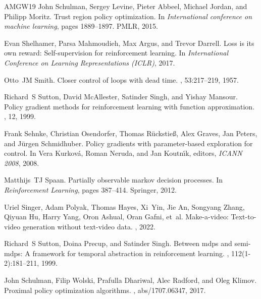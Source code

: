 \begin{thebibliography}{AMGW{\etalchar{+}}19}
John Schulman, Sergey Levine, Pieter Abbeel, Michael Jordan, and Philipp Moritz.
\newblock Trust region policy optimization.
\newblock In {\em International conference on machine learning}, pages 1889--1897. PMLR, 2015.

Evan Shelhamer, Parsa Mahmoudieh, Max Argus, and Trevor Darrell.
\newblock Loss is its own reward: Self-supervision for reinforcement learning.
\newblock In {\em International Conference on Learning Representations (ICLR)}, 2017.

Otto~JM Smith.
\newblock Closer control of loops with dead time.
, 53:217--219, 1957.

Richard~S Sutton, David McAllester, Satinder Singh, and Yishay Mansour.
\newblock Policy gradient methods for reinforcement learning with function approximation.
, 12, 1999.

Frank Sehnke, Christian Osendorfer, Thomas R{\"{u}}ckstie{\ss}, Alex Graves, Jan Peters, and J{\"{u}}rgen Schmidhuber.
\newblock Policy gradients with parameter-based exploration for control.
\newblock In Vera Kurkov{\'{a}}, Roman Neruda, and Jan Koutn{\'{\i}}k, editors, {\em ICANN 2008}, 2008.

Matthijs~TJ Spaan.
\newblock Partially observable markov decision processes.
\newblock In {\em Reinforcement Learning}, pages 387--414. Springer, 2012.

Uriel Singer, Adam Polyak, Thomas Hayes, Xi~Yin, Jie An, Songyang Zhang, Qiyuan Hu, Harry Yang, Oron Ashual, Oran Gafni, et~al.
\newblock Make-a-video: Text-to-video generation without text-video data.
, 2022.

Richard~S Sutton, Doina Precup, and Satinder Singh.
\newblock Between mdps and semi-mdps: A framework for temporal abstraction in reinforcement learning.
, 112(1-2):181--211, 1999.

John Schulman, Filip Wolski, Prafulla Dhariwal, Alec Radford, and Oleg Klimov.
\newblock Proximal policy optimization algorithms.
, abs/1707.06347, 2017.


\end{thebibliography}
